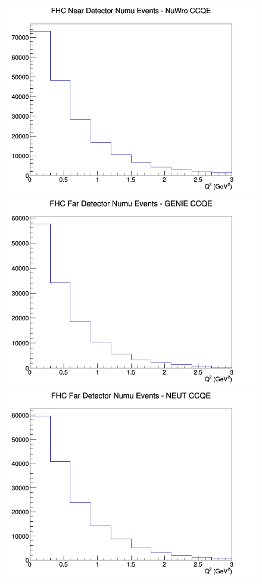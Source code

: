 \begin{figure}[h]
\endminipage
{}
\includegraphics[width=\linewidth]{Q2/nominal/CCQE_FHC_ND_numu_Q2_NuWro.png}
\endminipage
\newline
{}
\includegraphics[width=\linewidth]{Q2/nominal/CCQE_FHC_FD_numu_Q2_GENIE.png}
\endminipage
{}
\includegraphics[width=\linewidth]{Q2/nominal/CCQE_FHC_FD_numu_Q2_NEUT.png}

\end{figure}
